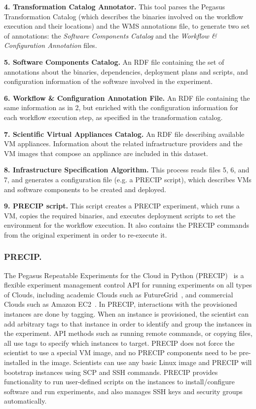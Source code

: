 \documentclass[final,5p,times,twocolumn]{elsarticle}
\begin{document}
\noindent \textbf{4. Transformation Catalog Annotator.} This tool parses the Pegasus Transformation Catalog (which describes the binaries involved on the workflow execution and their locations) and the WMS annotations file, to generate two set of annotations: the \emph{Software Components Catalog} and the \emph{Workflow \& Configuration Annotation} files.

\noindent \textbf{5. Software Components Catalog.} An RDF file containing the set of annotations about the binaries, dependencies, deployment plans and scripts, and configuration information of the software involved in the experiment.

\noindent \textbf{6. Workflow \& Configuration Annotation File.} An RDF file containing the same information as in 2, but enriched with the configuration information for each workflow execution step, as specified in the transformation catalog.

\noindent \textbf{7. Scientific Virtual Appliances Catalog.} An RDF file describing available VM appliances. Information about the related infrastructure providers and the VM images that compose an appliance are included in this dataset.

\noindent \textbf{8. Infrastructure Specification Algorithm.} This process reads files 5, 6, and 7, and generates a configuration file (e.g. a PRECIP script), which describes VMs and software components to be created and deployed.

\noindent \textbf{9. PRECIP script.} This script creates a PRECIP experiment, which runs a VM, copies the required binaries, and executes deployment scripts to set the environment for the workflow execution. It also contains the PRECIP commands from the original experiment in order to re-execute it.


\subsubsection{PRECIP.}
The Pegasus Repeatable Experiments for the Cloud in Python (PRECIP)~\cite{Azarnoosh-CRC-2013} is a flexible experiment management control API for running experiments on all types of Clouds, including academic Clouds such as FutureGrid~\cite{futuregrid}, and commercial Clouds such as Amazon EC2~\cite{aws}. In PRECIP, interactions with the provisioned instances are done by tagging. When an instance is provisioned, the scientist can add arbitrary tags to that instance in order to identify and group the instances in the experiment. API methods such as running remote commands, or copying files, all use tags to specify which instances to target. PRECIP does not force the scientist to use a special VM image, and no PRECIP components need to be pre-installed in the image. Scientists can use any basic Linux image and PRECIP will bootstrap instances using SCP and SSH commands. PRECIP provides functionality to run user-defined scripts on the instances to install/configure software and run experiments, and also manages SSH keys and security groups automatically.
\end{document}
